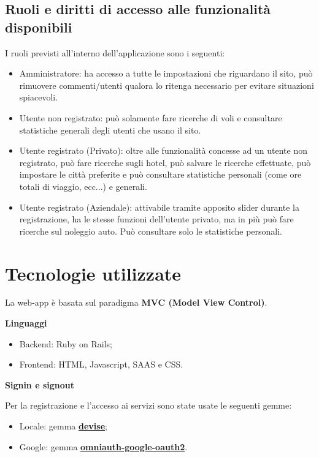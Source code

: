 \documentclass[11pt]{article}
\begin{document}
\subsection{Ruoli e diritti di accesso alle funzionalità disponibili}\label{roles}
I ruoli previsti all’interno dell’applicazione sono i seguenti:
\begin{itemize}
	\item Amministratore: ha accesso a tutte le impostazioni che riguardano il sito, può rimuovere commenti/utenti qualora lo ritenga necessario per evitare situazioni spiacevoli.
	\item Utente non registrato: può solamente fare ricerche di voli e consultare statistiche generali degli utenti che usano il sito.
	\item Utente registrato (Privato): oltre alle funzionalità concesse ad un utente non registrato, può fare ricerche sugli hotel, può salvare le ricerche effettuate, può impostare le città preferite e può consultare statistiche personali (come ore totali di viaggio, ecc...) e generali.
	\item Utente registrato (Aziendale): attivabile tramite apposito slider durante la registrazione, ha le stesse funzioni dell’utente privato, ma in più può fare ricerche sul noleggio auto. Può consultare solo le statistiche personali.
\end{itemize}


\section{Tecnologie utilizzate}
La web-app è basata sul paradigma \textbf{MVC (Model View Control)}.\\

\begin{large}\textbf{Linguaggi}\end{large}
\begin{itemize}
	\item Backend: Ruby on Rails;
	\item Frontend: HTML, Javascript, SAAS e CSS.
\end{itemize}

\begin{large}\textbf{Signin e signout}\\\end{large}
Per la registrazione e l'accesso ai servizi sono state usate le seguenti gemme:
\begin{itemize}
	\item Locale: gemma \href{https://github.com/plataformatec/devise}{\textbf{devise}};
	\item Google: gemma \href{https://github.com/zquestz/omniauth-google-oauth2}{\textbf{omniauth-google-oauth2}}.
\end{itemize}
\end{document}
